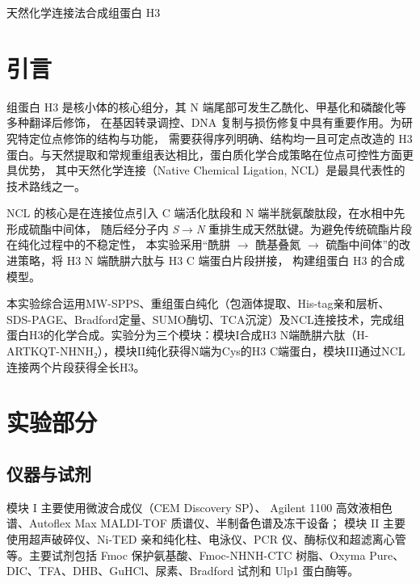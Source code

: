 \documentclass[a4paper]{article}
\newcommand{\zihaoSan}{\fontsize{16pt}{24pt}\selectfont}
\newcommand{\zihaoWu}{\fontsize{10.5pt}{16pt}\selectfont}
\begin{document}
\zihaoWu

\begin{center}
	{\zihaoSan\heiti 天然化学连接法合成组蛋白 H3}
\end{center}

\vspace{6pt}

\section{引言}
\vspace{-0.5em}

组蛋白 H3 是核小体的核心组分，其 N 端尾部可发生乙酰化、甲基化和磷酸化等多种翻译后修饰，
在基因转录调控、DNA 复制与损伤修复中具有重要作用。为研究特定位点修饰的结构与功能，
需要获得序列明确、结构均一且可定点改造的 H3 蛋白。与天然提取和常规重组表达相比，蛋白质化学合成策略在位点可控性方面更具优势，
其中天然化学连接（Native Chemical Ligation, NCL）是最具代表性的技术路线之一\cite{dawson1994,kent2009}。

NCL 的核心是在连接位点引入 C 端活化肽段和 N 端半胱氨酸肽段，在水相中先形成硫酯中间体，
随后经分子内 \textit{S}$\rightarrow$\textit{N} 重排生成天然肽键。为避免传统硫酯片段在纯化过程中的不稳定性，
本实验采用“酰肼 $\rightarrow$ 酰基叠氮 $\rightarrow$ 硫酯中间体”的改进策略，将 H3 N 端酰肼六肽与 H3 C 端蛋白片段拼接，
构建组蛋白 H3 的合成模型\cite{zhang2024,collins2023}。

本实验综合运用MW-SPPS、重组蛋白纯化（包涵体提取、His-tag亲和层析、SDS-PAGE、Bradford定量、SUMO酶切、TCA沉淀）及NCL连接技术，完成组蛋白H3的化学合成。实验分为三个模块：模块I合成H3 N端酰肼六肽（H-ARTKQT-NHNH₂），模块II纯化获得N端为Cys的H3 C端蛋白，模块III通过NCL连接两个片段获得全长H3。

\section{实验部分}
\vspace{-0.5em}

\subsection{仪器与试剂}

模块 I 主要使用微波合成仪（CEM Discovery SP）、
Agilent 1100 高效液相色谱、Autoflex Max MALDI-TOF 质谱仪、半制备色谱及冻干设备；
模块 II 主要使用超声破碎仪、Ni-TED 亲和纯化柱、电泳仪、PCR 仪、酶标仪和超滤离心管等。主要试剂包括
Fmoc 保护氨基酸、Fmoc-NHNH-CTC 树脂、Oxyma Pure、DIC、TFA、DHB、GuHCl、尿素、Bradford 试剂和 Ulp1 蛋白酶等。
\end{document}
